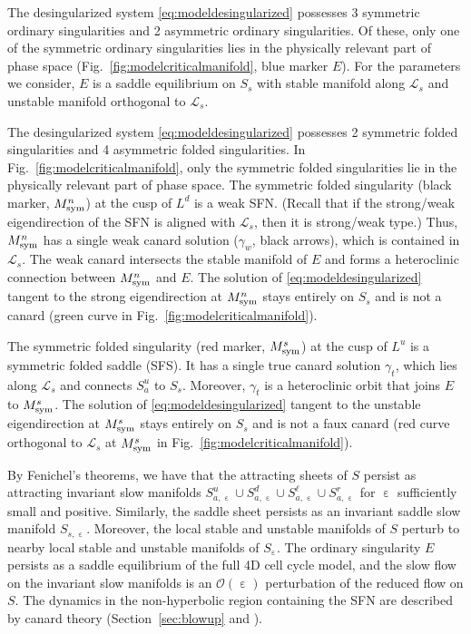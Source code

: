 \documentclass[10pt,onecolumn]{article}
\theoremstyle{plain}
\DeclareMathOperator{\eps}{\varepsilon}
\begin{document}
The desingularized system \eqref{eq:modeldesingularized} possesses 3 symmetric ordinary singularities and 2 asymmetric ordinary singularities.
Of these, only one of the symmetric ordinary singularities lies in the physically relevant part of phase space (Fig.~\ref{fig:modelcriticalmanifold}, blue marker $E$). For the parameters we consider, $E$ is a saddle equilibrium on $S_s$ with stable manifold along $\mathcal L_s$ and unstable manifold orthogonal to $\mathcal L_s$. 

The desingularized system \eqref{eq:modeldesingularized} possesses 2 symmetric folded singularities and 4 asymmetric folded singularities. 
In Fig.~\ref{fig:modelcriticalmanifold}, only the symmetric folded singularities lie in the physically relevant part of phase space. 
The symmetric folded singularity (black marker, $M_{\rm sym}^n$) at the cusp of $L^d$ is a weak SFN. 
(Recall that if the strong/weak eigendirection of the SFN is aligned with $\mathcal L_s$, then it is strong/weak type.)
Thus, $M_{\rm sym}^n$ has a single weak canard solution ($\gamma_w$, black arrows), which is contained in $\mathcal L_s$. 
The weak canard intersects the stable manifold of $E$ and forms a heteroclinic connection between $M_{\rm sym}^n$ and $E$. 
The solution of \eqref{eq:modeldesingularized} tangent to the strong eigendirection at $M_{\rm sym}^n$ stays entirely on $S_s$ and is not a canard (green curve in Fig.~\ref{fig:modelcriticalmanifold}).

The symmetric folded singularity (red marker, $M_{\rm sym}^s$) at the cusp of $L^u$ is a symmetric folded saddle (SFS). 
It has a single true canard solution $\gamma_t$, which lies along $\mathcal L_s$ and connects $S_a^u$ to $S_s$.
Moreover, $\gamma_t$ is a heteroclinic orbit that joins $E$ to $M_{\rm sym}^s$. 
The solution of \eqref{eq:modeldesingularized} tangent to the unstable eigendirection at $M_{\rm sym}^s$ stays entirely on $S_s$ and is not a faux canard (red curve orthogonal to $\mathcal L_s$ at $M_{\rm sym}^s$ in Fig.~\ref{fig:modelcriticalmanifold}).  

By Fenichel's theorems, we have that the attracting sheets of $S$ persist as attracting invariant slow manifolds $S_{a,\eps}^u \cup S_{a,\eps}^d \cup S_{a,\eps}^{\ell} \cup S_{a,\eps}^r$ for $\eps$ sufficiently small and positive. Similarly, the saddle sheet persists as an invariant saddle slow manifold $S_{s,\eps}$. Moreover, the local stable and unstable manifolds of $S$ perturb to nearby local stable and unstable manifolds of $S_{\eps}$. The ordinary singularity $E$ persists as a saddle equilibrium of the full 4D cell cycle model, and the slow flow on the invariant slow manifolds is an $\mathcal O(\eps)$ perturbation of the reduced flow on $S$. The dynamics in the non-hyperbolic region containing the SFN are described by canard theory (Section~\ref{sec:blowup} and \cite{Kristiansen2023,Szmolyan2001,Wex2005}). 
\end{document}
